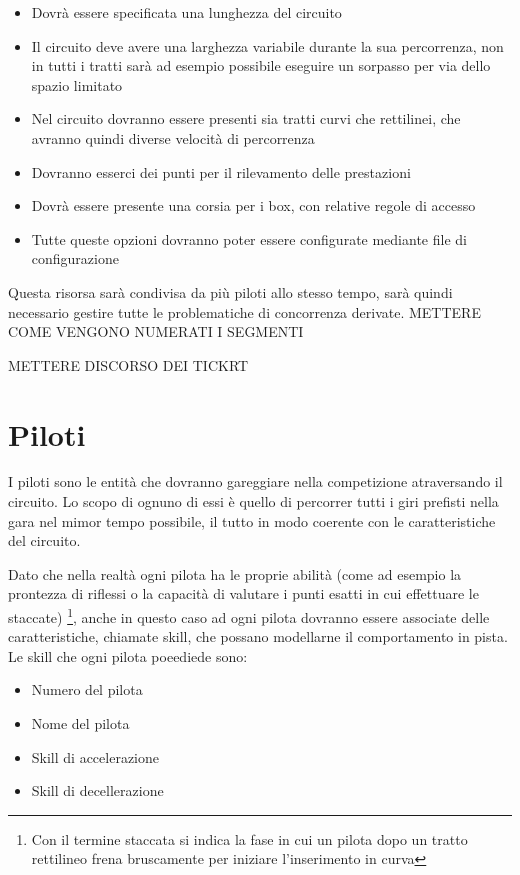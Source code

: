 \documentclass[a4paper,11pt, twoside]{book}
\begin{document}
	\begin{itemize}
	  \item Dovrà essere specificata una lunghezza del circuito
	  \item Il circuito deve avere una larghezza variabile durante la sua percorrenza, non in tutti i tratti sarà
		ad esempio possibile eseguire un sorpasso per via dello spazio limitato
	  \item Nel circuito dovranno essere presenti sia tratti curvi che rettilinei, che avranno quindi diverse velocità
		di percorrenza
	  \item Dovranno esserci dei punti per il rilevamento delle prestazioni
	  \item Dovrà essere presente una corsia per i box, con relative regole di accesso
	  \item Tutte queste opzioni dovranno poter essere configurate mediante file di configurazione
	\end{itemize}
	
	Questa risorsa sarà condivisa da più piloti allo stesso tempo, sarà quindi necessario gestire
	tutte le problematiche di concorrenza derivate.
	        METTERE COME VENGONO NUMERATI I SEGMENTI

	METTERE DISCORSO DEI TICKRT
       
    \section{Piloti}
      I piloti sono le entità che dovranno gareggiare nella competizione atraversando il circuito.
      Lo scopo di ognuno di essi è quello di percorrer tutti i giri prefisti nella gara nel mimor tempo possibile,
      il tutto in modo coerente con le caratteristiche del circuito.
      
      Dato che nella realtà ogni pilota ha le proprie abilità (come ad esempio la prontezza di riflessi
      o la capacità di valutare i punti esatti in cui effettuare le staccate) \footnote{Con il termine staccata si indica 
      la fase in cui un pilota dopo un tratto rettilineo frena bruscamente per iniziare l'inserimento in curva},
      anche in questo caso ad ogni pilota dovranno essere associate delle caratteristiche, chiamate skill, che possano
      modellarne il comportamento in pista. Le skill che ogni pilota poeediede sono:
      
      \begin{itemize}
	\item Numero del pilota
	\item Nome del pilota
	\item Skill di accelerazione
	\item Skill di decellerazione
      \end{itemize}
      
\end{document}

